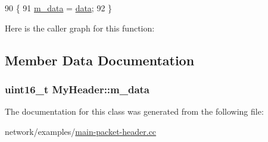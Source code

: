 \begin{DoxyCode}
90 \{
91   \hyperlink{classMyHeader_a1efc48541d85a063277f43179323e97e}{m\_data} = \hyperlink{topology-example-sim_8cc_a26c65296e316af77b787dc77469bb2a4}{data};
92 \}
\end{DoxyCode}


Here is the caller graph for this function\+:




\subsection{Member Data Documentation}
\subsubsection[{\texorpdfstring{m\+\_\+data}{m_data}}]{\setlength{\rightskip}{0pt plus 5cm}uint16\+\_\+t My\+Header\+::m\+\_\+data\hspace{0.3cm}{\ttfamily [private]}}\hypertarget{classMyHeader_a1efc48541d85a063277f43179323e97e}{}\label{classMyHeader_a1efc48541d85a063277f43179323e97e}


The documentation for this class was generated from the following file\+:\begin{DoxyCompactItemize}
\item 
network/examples/\hyperlink{main-packet-header_8cc}{main-\/packet-\/header.\+cc}\end{DoxyCompactItemize}
